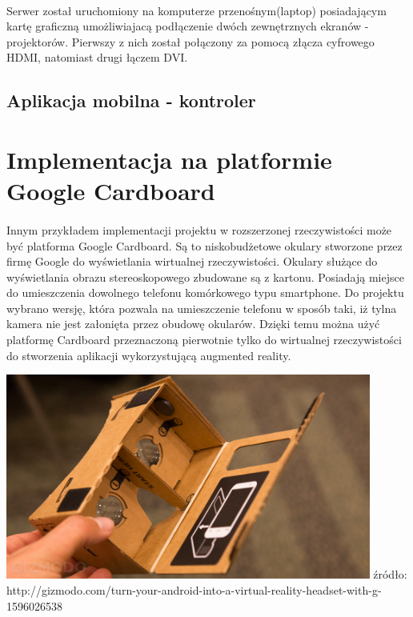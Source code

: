 \documentclass[12pt]{article}
\begin{document}
{\paragraph{}
Serwer został uruchomiony na komputerze przenośnym(laptop) posiadającym kartę graficzną umożliwiajacą podłączenie dwóch zewnętrznych ekranów - projektorów. Pierwszy z nich został połączony za pomocą złącza cyfrowego HDMI, natomiast drugi łączem DVI.
\subsection{Aplikacja mobilna - kontroler}


\newpage
\section{Implementacja na platformie Google Cardboard}
\paragraph{}
Innym przykładem implementacji projektu w rozszerzonej rzeczywistości może być platforma Google Cardboard. Są to niskobudżetowe okulary stworzone przez firmę Google do wyświetlania wirtualnej rzeczywistości. Okulary służące do wyświetlania obrazu stereoskopowego zbudowane są z kartonu. Posiadają miejsce do umieszczenia dowolnego telefonu komórkowego typu smartphone. Do projektu wybrano wersję, która pozwala na umieszczenie telefonu w sposób taki, iż tylna kamera nie jest załonięta przez obudowę okularów. Dzięki temu można użyć platformę Cardboard przeznaczoną pierwotnie tylko do wirtualnej rzeczywistości do stworzenia aplikacji wykorzystującą augmented reality.

\begin{center}
\includegraphics[width=0.9\textwidth]{images/cardboard.jpg}
\small {źródło: http://gizmodo.com/turn-your-android-into-a-virtual-reality-headset-with-g-1596026538 }
\end{center}

}
\end{document}
